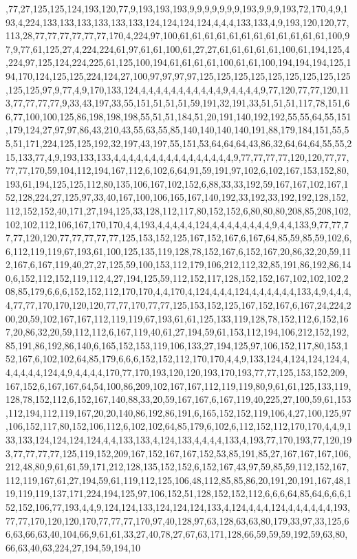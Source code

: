 ,77,27,125,125,124,193,120,77,9,193,193,193,9,9,9,9,9,9,9,193,9,9,9,193,72,170,4,9,193,4,224,133,133,133,133,133,133,124,124,124,124,4,4,4,133,133,4,9,193,120,120,77,113,28,77,77,77,77,77,77,170,4,224,97,100,61,61,61,61,61,61,61,61,61,61,61,61,100,97,9,77,61,125,27,4,224,224,61,97,61,61,100,61,27,27,61,61,61,61,61,100,61,194,125,4,224,97,125,124,224,225,61,125,100,194,61,61,61,61,100,61,61,100,194,194,194,125,194,170,124,125,125,224,124,27,100,97,97,97,97,125,125,125,125,125,125,125,125,125,125,125,97,9,77,4,9,170,133,124,4,4,4,4,4,4,4,4,4,4,4,9,4,4,4,4,9,77,120,77,77,120,113,77,77,77,77,9,33,43,197,33,55,151,51,51,51,59,191,32,191,33,51,51,51,117,78,151,66,77,100,100,125,86,198,198,198,55,51,51,184,51,20,191,140,192,192,55,55,64,55,151,179,124,27,97,97,86,43,210,43,55,63,55,85,140,140,140,140,191,88,179,184,151,55,55,51,171,224,125,125,192,32,197,43,197,55,151,53,64,64,64,43,86,32,64,64,64,55,55,215,133,77,4,9,193,133,133,4,4,4,4,4,4,4,4,4,4,4,4,4,4,4,4,9,77,77,77,77,120,120,77,77,77,77,170,59,104,112,194,167,112,6,102,6,64,91,59,191,97,102,6,102,167,153,152,80,193,61,194,125,125,112,80,135,106,167,102,152,6,88,33,33,192,59,167,167,102,167,152,128,224,27,125,97,33,40,167,100,106,165,167,140,192,33,192,33,192,192,128,152,112,152,152,40,171,27,194,125,33,128,112,117,80,152,152,6,80,80,80,208,85,208,102,102,102,112,106,167,170,170,4,4,193,4,4,4,4,4,124,4,4,4,4,4,4,4,4,9,4,4,133,9,77,77,77,77,120,120,77,77,77,77,77,125,153,152,125,167,152,167,6,167,64,85,59,85,59,102,6,6,112,119,119,67,193,61,100,125,135,119,128,78,152,167,6,152,167,20,86,32,20,59,112,167,6,167,119,40,27,27,125,59,100,153,112,179,106,212,112,32,85,191,86,192,86,140,6,152,112,152,119,112,4,27,194,125,59,112,152,117,128,152,152,167,102,102,102,208,85,179,6,6,6,152,152,112,170,170,4,4,170,4,124,4,4,4,124,4,4,4,4,4,4,133,4,9,4,4,4,4,77,77,170,170,120,120,77,77,170,77,77,125,153,152,125,167,152,167,6,167,24,224,200,20,59,102,167,167,112,119,119,67,193,61,61,125,133,119,128,78,152,112,6,152,167,20,86,32,20,59,112,112,6,167,119,40,61,27,194,59,61,153,112,194,106,212,152,192,85,191,86,192,86,140,6,165,152,153,119,106,133,27,194,125,97,106,152,117,80,153,152,167,6,102,102,64,85,179,6,6,6,152,152,112,170,170,4,4,9,133,124,4,124,124,124,4,4,4,4,4,4,124,4,9,4,4,4,4,170,77,170,193,120,120,193,170,193,77,77,125,153,152,209,167,152,6,167,167,64,54,100,86,209,102,167,167,112,119,119,80,9,61,61,125,133,119,128,78,152,112,6,152,167,140,88,33,20,59,167,167,6,167,119,40,225,27,100,59,61,153,112,194,112,119,167,20,20,140,86,192,86,191,6,165,152,152,119,106,4,27,100,125,97,106,152,117,80,152,106,112,6,102,102,64,85,179,6,102,6,112,152,112,170,170,4,4,9,133,133,124,124,124,124,4,4,133,133,4,124,133,4,4,4,4,133,4,193,77,170,193,77,120,193,77,77,77,77,125,119,152,209,167,152,167,167,152,53,85,191,85,27,167,167,167,106,212,48,80,9,61,61,59,171,212,128,135,152,152,6,152,167,43,97,59,85,59,112,152,167,112,119,167,61,27,194,59,61,119,112,125,106,48,112,85,85,86,20,191,20,191,167,48,119,119,119,137,171,224,194,125,97,106,152,51,128,152,152,112,6,6,6,64,85,64,6,6,6,152,152,106,77,193,4,4,9,124,124,133,124,124,124,133,4,124,4,4,4,124,4,4,4,4,4,4,193,77,77,170,120,120,170,77,77,77,170,97,40,128,97,63,128,63,63,80,179,33,97,33,125,66,63,66,63,40,104,66,9,61,61,33,27,40,78,27,67,63,171,128,66,59,59,59,192,59,63,80,66,63,40,63,224,27,194,59,194,10